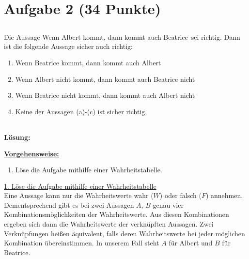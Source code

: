 \section*{Aufgabe 2 (34 Punkte)}
\vspace{0.4cm}
\subsection*{}
Die Aussage \glqq Wenn Albert kommt, dann kommt auch Beatrice\grqq~sei richtig.
Dann ist die folgende Aussage sicher auch richtig:
\renewcommand{\labelenumi}{(\alph{enumi})}
\begin{enumerate}
	\item \glqq Wenn Beatrice kommt, dann kommt auch Albert\grqq
	\item \glqq Wenn Albert nicht kommt, dann kommt auch Beatrice nicht\grqq
	\item
	\glqq Wenn Beatrice nicht kommt, dann kommt auch Albert nicht\grqq
	
	\item
	Keine der Aussagen (a)-(c) ist sicher richtig.
\end{enumerate}
\ \\
\textbf{Lösung:}
\begin{mdframed}
\underline{\textbf{Vorgehensweise:}}
\renewcommand{\labelenumi}{\theenumi.}
\begin{enumerate}
\item Löse die Aufgabe mithilfe einer Wahrheitstabelle.

\end{enumerate}
\end{mdframed}

\underline{1. Löse die Aufgabe mithilfe einer Wahrheitstabelle}\\
Eine Aussage kann nur die Wahrheitswerte wahr ($ W $) oder falsch ($ F $) annehmen.
Dementsprechend gibt es bei zwei Aussagen $ A $, $ B $ genau vier Kombinationsmöglichkeiten der Wahrheitswerte.
Aus diesen Kombinationen ergeben sich dann die Wahrheitswerte der verknüpften Aussagen.
Zwei Verknüpfungen heißen äquivalent, falls deren Wahrheitswerte bei jeder möglichen Kombination übereinstimmen.
In unserem Fall steht $ A $ für Albert und $ B $ für Beatrice.

